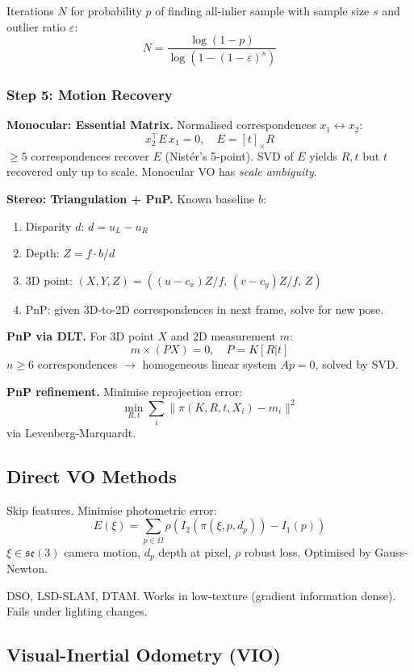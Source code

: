 \documentclass[11pt,a4paper]{article}
\begin{document}
Iterations $N$ for probability $p$ of finding all-inlier sample with sample size $s$ and outlier ratio $\varepsilon$:
\[
N = \frac{\log(1-p)}{\log(1 - (1-\varepsilon)^s)}
\]

\subsubsection{Step 5: Motion Recovery}

\textbf{Monocular: Essential Matrix.} Normalised correspondences $x_1 \leftrightarrow x_2$:
\[
x_2^\top E\, x_1 = 0, \quad E = [t]_\times R
\]
$\geq 5$ correspondences recover $E$ (Nistér's 5-point). SVD of $E$ yields $R, t$ but $t$ recovered only up to scale. Monocular VO has \emph{scale ambiguity}.

\textbf{Stereo: Triangulation + PnP.} Known baseline $b$:
\begin{enumerate}
\item Disparity $d$: $d = u_L - u_R$
\item Depth: $Z = f \cdot b / d$
\item 3D point: $(X, Y, Z) = ((u - c_x)Z/f,\, (v - c_y)Z/f,\, Z)$
\item PnP: given 3D-to-2D correspondences in next frame, solve for new pose.
\end{enumerate}

\textbf{PnP via DLT.} For 3D point $X$ and 2D measurement $m$:
\[
m \times (PX) = 0, \quad P = K[R|t]
\]
$n \geq 6$ correspondences $\to$ homogeneous linear system $A p = 0$, solved by SVD.

\textbf{PnP refinement.} Minimise reprojection error:
\[
\min_{R, t} \sum_i \|\pi(K, R, t, X_i) - m_i\|^2
\]
via Levenberg-Marquardt.

\subsection{Direct VO Methods}

Skip features. Minimise photometric error:
\[
E(\xi) = \sum_{p \in \Omega} \rho\!\left(I_2(\pi(\xi, p, d_p)) - I_1(p)\right)
\]
$\xi \in \mathfrak{se}(3)$ camera motion, $d_p$ depth at pixel, $\rho$ robust loss. Optimised by Gauss-Newton.

DSO, LSD-SLAM, DTAM. Works in low-texture (gradient information dense). Fails under lighting changes.

\subsection{Visual-Inertial Odometry (VIO)}
\end{document}
